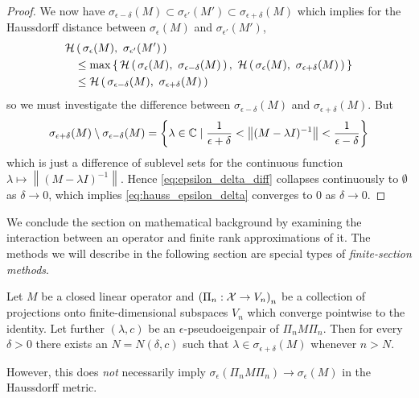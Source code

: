 \begin{proof}
    We now have 
    $\sigma_{\epsilon - \delta} (M) 
    \subset \sigma_{\epsilon'} (M') 
    \subset \sigma_{\epsilon + \delta} (M)$
    which implies for the Haussdorff distance between $\sigma_\epsilon (M)$ and 
    $\sigma_{\epsilon'} (M')$,
    \begin{align}
        \scrH & \left(\, \sigma_\epsilon (M),\ \sigma_{\epsilon'} (M') \,\right) \\
        & \leq \max \left\{\,
            \scrH \left(\, \sigma_\epsilon (M),\ \sigma_{\epsilon - \delta} (M) \,\right),\ 
            \scrH \left(\, \sigma_\epsilon (M),\ \sigma_{\epsilon + \delta} (M) \,\right) 
        \,\right\} \\
        & \leq \scrH \left(\, 
            \sigma_{\epsilon - \delta} (M),\ 
            \sigma_{\epsilon + \delta} (M) 
        \,\right) \label{eq:hauss_epsilon_delta}
    \end{align}
    so we must investigate the difference between $\sigma_{\epsilon - \delta} (M)$ and 
    $\sigma_{\epsilon + \delta} (M)$. But 
    \begin{equation}
        \label{eq:epsilon_delta_diff}
        \sigma_{\epsilon + \delta} (M) \setminus \sigma_{\epsilon - \delta} (M) 
        = \left\{ \lambda \in \mathbb{C} \mid 
            \frac{1}{\epsilon + \delta}
            < \left\| (M - \lambda I)^{-1} \right\| 
            < \frac{1}{\epsilon - \delta}
        \right\}
    \end{equation}
    which is just a difference of sublevel sets for the continuous function 
    $\lambda \mapsto \left\| (M - \lambda I)^{-1} \right\|$. Hence 
    \ref{eq:epsilon_delta_diff} collapses continuously to $\emptyset$ as $\delta \to 0$, 
    which implies \ref{eq:hauss_epsilon_delta} converges to $0$ as $\delta \to 0$. 
\end{proof}

We conclude the section on mathematical background by examining the interaction between 
an operator and finite rank approximations of it. The methods we will describe in the 
following section are special types of \emph{finite-section methods}. 

\begin{theorem}
    \label{thm:projection_pseudospectrum}
    Let $M$ be a closed linear operator and $\left( \Pi_n : \mathcal{X} \to V_n \right)_n$ be 
    a collection of projections onto finite-dimensional subspaces $V_n$ which converge 
    pointwise to the identity. Let further $(\lambda, c)$ be an 
    $\epsilon$-pseudoeigenpair of $\Pi_n M \Pi_n$. Then for every $\delta > 0$ 
    there exists an $N = N(\delta, c)$ such that 
    $\lambda \in \sigma_{\epsilon + \delta} (M)$ whenever $n > N$. 

    However, this does \emph{not} necessarily imply 
    $\sigma_\epsilon (\Pi_n M \Pi_n) \to \sigma_\epsilon (M)$ in the Haussdorff metric. 
\end{theorem}


